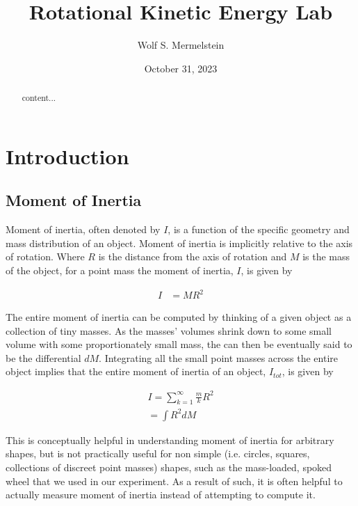 \documentclass[coverpage]{article}
\title{Rotational Kinetic Energy Lab}
\date{October 31, 2023}
\author{Wolf S. Mermelstein}
\begin{document}
	
	
	\maketitle
	
	\begin{abstract}
		content...
	\end{abstract}
	
	\tableofcontents
	
	\twocolumn
	
	\section{Introduction}
	
	\subsection{Moment of Inertia}
	
	Moment of inertia, often denoted by $I$, is a function of the specific geometry and mass distribution of an object. Moment of inertia is implicitly relative to the axis of rotation. Where $R$ is the distance from the axis of rotation and $M$ is the mass of the object, for a point mass the moment of inertia, $I$, is given by
	
	\begin{align}
		I&=M R^2 \label{eq:def-i}
	\end{align}

	The entire moment of inertia can be computed by thinking of a given object as a collection of tiny masses. As the masses' volumes shrink down to some small volume with some proportionately small mass, the can then be eventually said to be the differential $dM$. Integrating all the small point masses across the entire object implies that the entire moment of inertia of an object, $I_{tot}$, is given by
	
	\begin{align}
		I=\sum_{k=1}^{\infty}{\frac{m}{k}R^2}\\
		=\int{R^2dM}
	\end{align}

	This is conceptually helpful in understanding moment of inertia for arbitrary shapes, but is not practically useful for non simple (i.e. circles, squares, collections of discreet point masses) shapes, such as the mass-loaded, spoked wheel that we used in our experiment. As a result of such, it is often helpful to actually measure moment of inertia instead of attempting to compute it.
	
\end{document}
